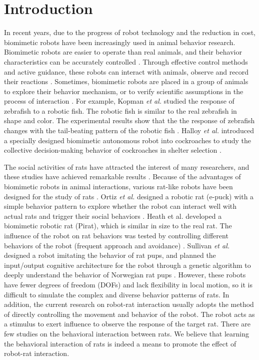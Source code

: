 \section{Introduction}
In recent years, due to the progress of robot technology and the reduction in
cost, biomimetic robots have been increasingly used in animal behavior research.
Biomimetic robots are easier to operate than real animals, and their behavior
characteristics can be accurately controlled \cite{abdai_poking_the_futhre,
yeager_new_tech}. Through effective control methods and active guidance, these
robots can interact with animals, observe and record their reactions
\cite{son_entice_insect,Taylor2008frogs-17969,kopman_closed_loop_zebrafish,
partan_wild_tree,5650930}. Sometimes, biomimetic robots are placed in a group of
animals to explore their behavior mechanism, or to verify scientific assumptions
in the process of interaction \cite{doi:10.1126science.1144259,ward_quorum,
gribovskiy_mobile_robot,faria_novel_method}. For example, Kopman \textit{et al.}
studied the response of zebrafish to a robotic fish. The robotic fish is similar
to the real zebrafish in shape and color. The experimental results show that the
the response of zebrafish changes with the tail-beating pattern of the robotic
fish \cite{kopman_closed_loop_zebrafish}. Halloy \textit{et al.} introduced a
specially designed biomimetic autonomous robot into cockroaches to study the
collective decision-making behavior of cockroaches in shelter selection
\cite{doi:10.1126science.1144259}.

The social activities of rats have attracted the interest of many researchers,
and these studies have achieved remarkable results
\cite{fleliz_bidirectional_modulation,weiss_shall_two_walk}. Because of the
advantages of biomimetic robots in animal interactions, various rat-like robots
have been designed for the study of rats \cite{Lucas2018DesignOA,Shi_bb_2013,
Shi_bb_2015,shi-gao-tro-2022}. Ortiz \textit{et al.} designed a robotic rat
(e-puck) with a simple behavior pattern to explore whether the robot can
interact well with actual rats and trigger their social behaviors
\cite{Rusalky-sit}. Heath et al. developed a biomimetic robotic rat (Pirat),
which is similar in size to the real rat. The influence of the robot on rat
behaviors was tested by controlling different behaviors of the robot (frequent
approach and avoidance) \cite{pirat}. Sullivan \textit{et al.} designed a robot
imitating the behavior of rat pups, and planned the input/output cognitive
architecture for the robot through a genetic algorithm to deeply understand the
behavior of Norwegian rat pups \cite{sullivan-arl-2015}. However, these robots
have fewer degrees of freedom (DOFs) and lack flexibility in local motion, so it
is difficult to simulate the complex and diverse behavior patterns of rats. In
addition, the current research on robot-rat interaction usually adopts the
method of directly controlling the movement and behavior of the robot. The robot
acts as a stimulus to exert influence to observe the response of the target rat.
There are few studies on the behavioral interaction between rats. We believe
that learning the behavioral interaction of rats is indeed a means to promote
the effect of robot-rat interaction.


